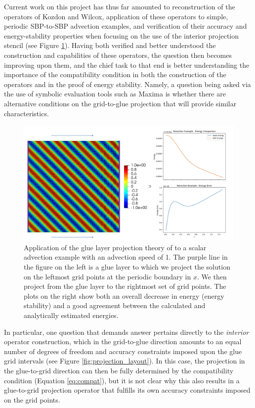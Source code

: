 Current work on this project has thus far amounted to reconstruction of the
operators of Kozdon and Wilcox, application of these operators to simple, periodic
SBP-to-SBP advection examples, and verification of their accuracy and energy-stability
properties when focusing on the use of the interior projection stencil (see Figure \ref{fig:advection_projection}).
Having both verified and better understood the construction and capabilities of these operators,
the question then becomes improving upon them, and the chief task to that end is
better understanding the importance of the compatibility condition in both the
construction of the operators and in the proof of energy stability. Namely,
a question being asked via the use of symbolic evaluation tools such as Maxima \cite{li2008maxima}
is whether there are alternative conditions on the grid-to-glue projection that
will provide similar characteristics.
\begin{figure}
\centering
\includegraphics[width=0.8\linewidth,trim=4 4 4 4,clip]{figures/advection_projection.png}
\caption{Application of the glue layer projection theory of \cite{kozdon2016stable} to a
	 scalar advection example with an advection speed of 1. The purple line in the figure
	 on the left is a glue layer to which we project the solution on the leftmost grid points
	 at the periodic boundary in $x$. We then project from the glue layer to the rightmost set
	 of grid points. The plots on the right show both an overall decrease in energy (energy stability)
	 and a good agreement between the calculated and analytically estimated energies.}
\label{fig:advection_projection}
\end{figure}
In particular, one question that demands answer pertains directly to the
\emph{interior} operator construction, which in the grid-to-glue direction
amounts to an equal number of degrees of freedom and accuracy constraints
imposed upon the glue grid intervals (see Figure \ref{fig:projection_layout}). In
this case, the projection in the glue-to-grid direction can then be fully
determined by the compatibility condition (Equation \ref{eq:compat}), but
it is not clear why this also results in a glue-to-grid projection operator
that fulfills its own accuracy constraints imposed on the grid points.

